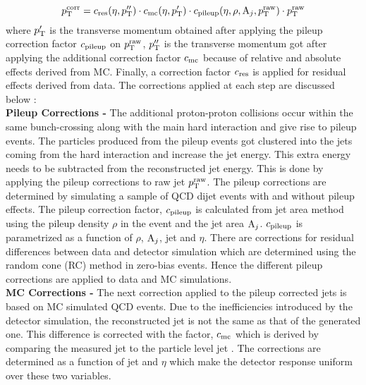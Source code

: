\begin{equation}
p^{\rm corr}_{\rm T} = c_{\rm res}(\eta,p''_{\rm T})\cdot c_{\rm mc}(\eta,p'_{\rm T})\cdot c_{\rm pileup}(\eta,\rho,{\rm A}_{j},p^{\rm raw}_{\rm T})\cdot p^{\rm raw}_{\rm T}
\end{equation}
where $p'_{\rm T}$ is the transverse momentum obtained after applying the pileup correction factor $c_{\rm pileup}$ on $p^{\rm raw}_{\rm T}$, $p''_{\rm T}$ is the transverse momentum got after applying the additional correction factor $c_{\rm mc}$ because of relative and absolute effects derived from MC. Finally, a correction factor $c_{\rm res}$ is applied for residual effects derived from data. The corrections applied at each step are discussed below : \\\newline
{\bf Pileup Corrections -} The additional proton-proton collisions occur within the same bunch-crossing along with the main hard interaction and give rise to pileup events. The particles produced from the pileup events got clustered into the jets coming from the hard interaction and increase the jet energy. This extra energy needs to be subtracted from the reconstructed jet energy. This is done by applying the pileup corrections to raw jet $p^{\rm raw}_{\rm T}$. The pileup corrections are determined by simulating a sample of QCD dijet events with and without pileup effects. The pileup correction factor, $c_{\rm pileup}$ is calculated from jet area method using the pileup density $\rho$ in the event and the jet area ${\rm A}_{j}$. $c_{\rm pileup}$ is parametrized as a function of $\rho$, ${\rm A}_{j}$, jet \pt and $\eta$. There are corrections for residual differences between data and detector simulation which are determined using the random cone (RC) method in zero-bias events. Hence the different pileup corrections are applied to data and MC simulations. \\ \newline
{\bf MC Corrections -} The next correction applied to the pileup corrected jets is based on MC simulated QCD events. Due to the inefficiencies introduced by the detector simulation, the reconstructed jet \pt is not the same as that of the generated one. This difference is corrected with the factor, $c_{\rm mc}$ which is derived by comparing the measured jet \pt to the particle level jet \pt. The corrections are determined as a function of jet \pt and $\eta$ which make the detector response uniform over these two variables. \\ \newline
